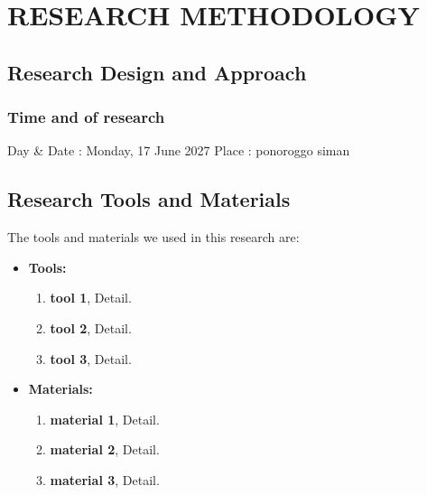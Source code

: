 \chapter{RESEARCH METHODOLOGY}
	\section{Research Design and Approach}
	\setlength{\leftskip}{0.7cm}
	\lipsum[1:1-3]
	
		\subsection{Time and  of research}
		\setlength{\leftskip}{1.4cm}
		Day \& Date : Monday, 17 June 2027
		Place		: ponoroggo siman
		
		
	\section{Research Tools and Materials}
	\setlength{\leftskip}{0.7cm}
	The tools and materials we used in this research are:
	\begin{itemize}
	\item \textbf{Tools:}
		\begin{enumerate}
		\item \textbf{tool 1}, Detail.
		\item \textbf{tool 2}, Detail.
		\item \textbf{tool 3}, Detail.
		\end{enumerate}
	\item \textbf{Materials:}
		\begin{enumerate}
		\item \textbf{material 1}, Detail.
		\item \textbf{material 2}, Detail.
		\item \textbf{material 3}, Detail.
	\end{enumerate}
	\end{itemize}
	
